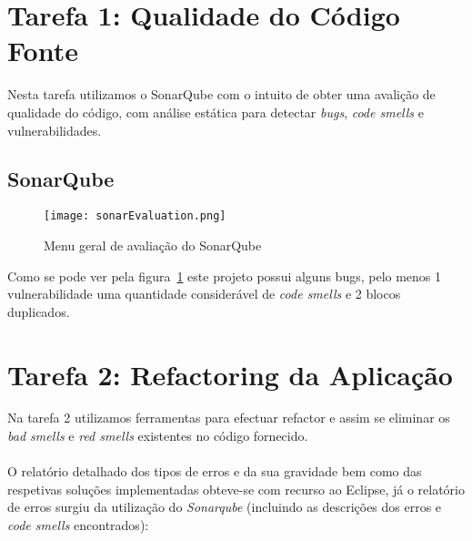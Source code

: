 \section{Tarefa 1: Qualidade do Código Fonte}
Nesta tarefa utilizamos o SonarQube com o intuito de obter uma avalição de qualidade do código, com análise estática para detectar \textit{bugs}, \textit{code smells} e vulnerabilidades.

\subsection{SonarQube}

\begin{figure}[H]

  \centering

  \texttt{[image: sonarEvaluation.png]}

  \caption {Menu geral de avaliação do SonarQube}

  \label {fig01}

\end{figure}


\par Como se pode ver pela figura~\ref{fig01} este projeto possui alguns bugs, pelo menos 1 vulnerabilidade uma quantidade considerável de \textit{code smells} e 2 blocos duplicados.
\newpage
\section{Tarefa 2: Refactoring da Aplicação}

Na tarefa 2 utilizamos ferramentas para efectuar refactor e assim se eliminar os \textit{bad smells} e \textit{red smells} existentes no
código fornecido.\\
\\
O relatório detalhado dos tipos de erros e da sua gravidade bem como das respetivas soluções implementadas obteve-se com  
recurso ao Eclipse, já o relatório de erros surgiu da utilização do \textit{Sonarqube} (incluindo as descrições dos erros e \textit{code smells} encontrados):

